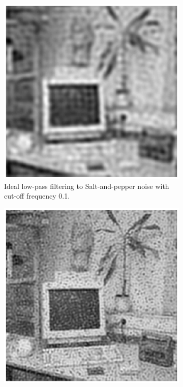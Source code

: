\documentclass[11pt,a4paper]{article}
\begin{document}
\begin{itemize}
\begin{figure}[!ht]
		\begin{subfigure}[t]{.32\linewidth} %
			\includegraphics[width=\columnwidth]{Q17_Lowpass_to_Sap_0_1.eps}
			\caption{\scriptsize Ideal low-pass filtering to Salt-and-pepper noise with cut-off frequency 0.1.}
			\label{fig:lowpassToSap0.1}
		\end{subfigure}
		\begin{subfigure}[t]{.32\linewidth} %
			\includegraphics[width=\columnwidth]{Q17_Lowpass_to_Sap_0_25.eps}

\end{subfigure}
\end{figure}
\end{itemize}
\end{document}
